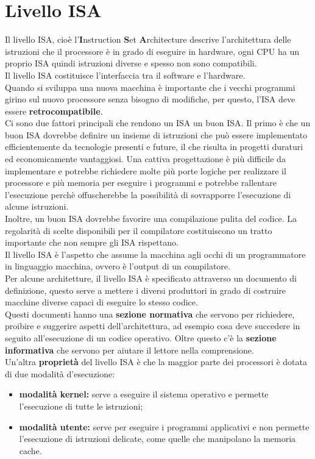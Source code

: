 \documentclass[12pt]{report}
\begin{document}
		\chapter{Livello ISA}
		Il livello ISA, cioè l'\textbf{I}nstruction \textbf{S}et \textbf{A}rchitecture descrive l'architettura delle istruzioni che il processore è in grado di eseguire in hardware, ogni CPU ha un proprio ISA quindi istruzioni diverse e spesso non sono compatibili. \\
		Il livello ISA costituisce l'interfaccia tra il software e l'hardware. \\
		Quando si sviluppa una nuova macchina è importante che i vecchi programmi girino sul nuovo processore senza bisogno di modifiche, per questo, l'ISA deve essere \textbf{retrocompatibile}. \\
		Ci sono due fattori principali che rendono un ISA un buon ISA. Il primo è che un buon ISA dovrebbe definire un insieme di istruzioni che può essere implementato efficientemente da tecnologie presenti e future, il che risulta in progetti duraturi ed economicamente vantaggiosi. Una cattiva progettazione è più difficile da implementare e potrebbe richiedere molte più porte logiche per realizzare il processore e più memoria per eseguire i programmi e potrebbe rallentare l'esecuzione perchè offuscherebbe la possibilità di sovrapporre l'esecuzione di alcune istruzioni. \\
		Inoltre, un buon ISA dovrebbe favorire una compilazione pulita del codice. La regolarità di scelte disponibili per il compilatore costituiscono un tratto importante che non sempre gli ISA rispettano. \\
		Il livello ISA è l'aspetto che assume la macchina agli occhi di un programmatore in linguaggio macchina, ovvero è l'output di un compilatore. \\
		Per alcune architetture, il livello ISA è specificato attraverso un documento di definizione, questo serve a mettere i diversi produttori in grado di costruire macchine diverse capaci di eseguire lo stesso codice. \\
		Questi documenti hanno una \textbf{sezione normativa} che servono per richiedere, proibire e suggerire aspetti dell'architettura, ad esempio cosa deve succedere in seguito all'esecuzione di un codice operativo. Oltre questo c'è la \textbf{sezione informativa} che servono per aiutare il lettore nella comprensione. \\
		Un'altra \textbf{proprietà} del livello ISA è che la maggior parte dei processori è dotata di due modalità d'esecuzione:
		\begin{itemize}
			\item \textbf{modalità kernel:} serve a eseguire il sistema operativo e permette l'esecuzione di tutte le istruzioni;
			\item \textbf{modalità utente:} serve per eseguire i programmi applicativi e non permette l'esecuzione di istruzioni delicate, come quelle che manipolano la memoria cache.
		\end{itemize}
\end{document}
